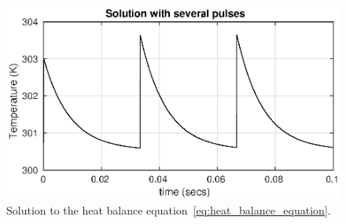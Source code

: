 \begin{figure} 
 \includegraphics[scale=0.9]{gfx/fig1_several_pulses.eps} 
 \caption{Solution to the heat balance equation~\eqref{eq:heat_balance_equation}.}
 \label{fig:solution_heat_balance_eq}
\end{figure}
